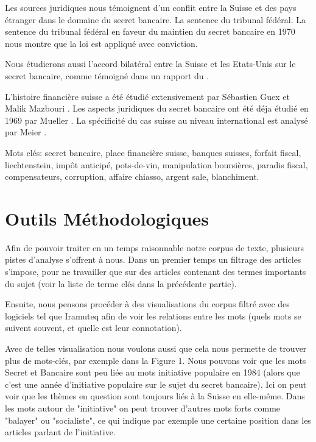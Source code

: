 \documentclass[11pt]{article}
\begin{document}
Les sources juridiques nous témoignent d'un conflit entre la Suisse et des pays
étranger dans le domaine du secret bancaire. La sentence du tribunal fédéral. 
La sentence du tribunal fédéral \citep{tribunalFederal70} en faveur du maintien 
du secret bancaire en 1970 nous montre que la loi est appliqué avec conviction.

Nous étudierons aussi l'accord bilatéral entre la Suisse et les Etats-Unis sur
le secret bancaire, comme témoigné dans un rapport du \citet{insiderTrading83}.

L’histoire financière suisse a été étudié extensivement par Sébastien Guex et
Malik Mazbouri \citep{Guex99} \citep{Guex00} \citep{Mazbouri12}.
Les aspects juridiques du secret bancaire ont été déja étudié en 1969
par Mueller \citep{Mueller69}.
La spécificité du cas suisse au niveau international est analysé par
Meier \citep{Meier12}.

Mots clés: secret bancaire, place financière suisse, banques suisses, forfait
fiscal, liechtenstein, impôt anticipé, pots-de-vin, manipulation boursières,
paradis fiscal, compensateurs, corruption, affaire chiasso, argent sale,
blanchiment.

\section{Outils Méthodologiques}

Afin de pouvoir traiter en un temps raisonnable notre corpus de texte, plusieurs
pistes d’analyse s’offrent à nous. Dans un premier temps un filtrage des
articles s’impose, pour ne travailler que sur des articles contenant des termes
importants du sujet (voir la liste de terme clés dans la précédente partie).

Ensuite, nous pensons procéder à des visualisations du corpus filtré avec des
logiciels tel que Iramuteq afin de voir les relations entre les mots (quels mots
se suivent souvent, et quelle est leur connotation).

Avec de telles visualisation nous voulons aussi que cela nous permette de
trouver plus de mots-clés, par exemple dans la Figure 1. Nous pouvons voir que
les mots Secret et Bancaire sont peu liée au mots initiative populaire en 1984
(alors que c'est une année d'initiative populaire sur le sujet du secret
bancaire). Ici on peut voir que les thèmes en question sont toujours liés à la
Suisse en elle-même. Dans les mots autour de "initiative" on peut trouver
d'autres mots forts comme "balayer" ou "socialiste", ce qui indique par exemple
une certaine position dans les articles parlant de l'initiative.
\end{document}
